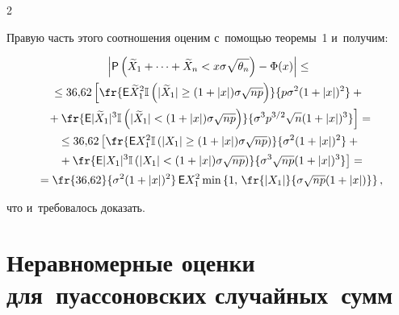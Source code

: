 \begin{multicols}{2}
$$


Правую часть этого соотношения оценим с~по\-мощью теоремы~1 и~получим:


\begin{multline*}


\left\vert {\sf


P}\left(\widetilde{X}_1+\cdots+\widetilde{X}_n<


x\sigma\sqrt{\theta_n}\right)-\Phi(x)\right\vert \le{}


\\[1pt]


\le 36{,}62\left[\fr{{\sf


E}\widetilde{X}_1^2\mathbb{I}\left(|\widetilde{X}_1|\ge(1+|x|)\sigma\sqrt{np}\right)}


{p\sigma^2(1+|x|)^2}+{}\right.\\[1pt]


\left.{}+


\fr{{\sf E}|\widetilde{X}_1|^3\mathbb{I}\left(|\widetilde{X}_1|<(1+|x|)


\sigma\sqrt{np}\right)}{\sigma^3p^{3/2}\sqrt{n}(1+|x|)^3}\right]={}


\\[1pt]


{}\le 36{,}62\left[\fr{{\sf E}X_1^2\mathbb{I}\left(|X_1|


\ge(1+|x|)\sigma\sqrt{np}\right)}{\sigma^2(1+|x|)^2}+{}\right.\\[1pt]


\left.{}+


\fr{{\sf E}|X_1|^3\mathbb{I}\left(|X_1|<(1+|x|)\sigma\sqrt{np}\right)}


{\sigma^3\sqrt{np}(1+|x|)^3}\right]=


\\[1pt]


{}= \fr{36{,}62}{\sigma^2(1+|x|)^2}\,{\sf E}X_1^2\min


\left\{1,\,\fr{|X_1|}{\sigma\sqrt{np}(1+|x|)}\right\},


\end{multline*}


что и~требовалось доказать.





\section{Неравномерные оценки для~пуассоновских случайных~сумм}






\end{multicols}
